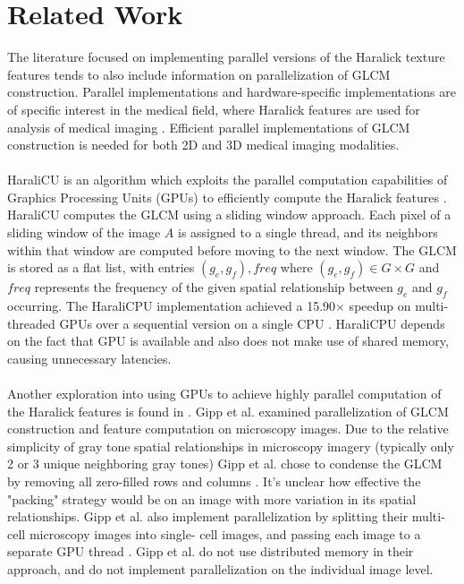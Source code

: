 \documentclass{article}
\begin{document}
\section{Related Work}
    The literature focused on implementing parallel versions of  the Haralick texture features tends to also include information on parallelization of GLCM construction. Parallel implementations and hardware-specific implementations are of specific interest in the medical field, where Haralick features are used for analysis of medical imaging \cite{medref1} \cite{medref2} \cite{medref3} \cite{medref4}. Efficient parallel implementations of GLCM construction is needed for both 2D and 3D medical imaging modalities. \\ \\ 
    HaraliCU is an algorithm which exploits the parallel computation capabilities of Graphics Processing Units (GPUs) to efficiently compute the Haralick features \cite{haralicpu}. HaraliCU computes the GLCM using a sliding window approach. Each pixel of a sliding window of the image $A$ is assigned to a single thread, and its neighbors within that window are computed before moving to the next window. The GLCM is stored as a flat list, with entries $(g_e, g_f), freq$ where $(g_e, g_f) \in G \times G$ and $freq$ represents the frequency of the given spatial relationship between $g_e$ and $g_f$ occurring. The HaraliCPU implementation achieved a 15.90$\times$ speedup on multi-threaded GPUs over a sequential version on a single CPU  \cite{haralicpu}. HaraliCPU depends on the fact that GPU is available and also does not make use of shared memory, causing unnecessary latencies. \\ \\ 
    Another exploration into using GPUs to achieve highly parallel computation of the Haralick features is found in \cite{gipp}. Gipp et al. examined parallelization of GLCM construction and feature computation on microscopy images. Due to the relative simplicity of gray tone spatial relationships in microscopy imagery (typically only 2 or 3 unique neighboring gray tones)  Gipp et al. chose to condense the GLCM by removing all zero-filled rows and columns \cite{gipp}. It's unclear how effective the "packing" strategy would be on an image with more variation in its spatial relationships. Gipp et al. also implement parallelization by splitting their multi-cell microscopy images into single- cell images, and passing each image to a separate GPU thread \cite{gipp}. Gipp et al. do not use distributed memory in their approach, and do not implement parallelization on the individual image level. \\ \\
\end{document}
